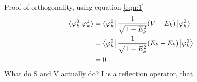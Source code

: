 \documentclass{article}
\begin{document}
Proof of orthogonality, using equation \ref{eqn:1}
\begin{align*}
\braket{\varphi_k^0}{\varphi_k^1} &= \bra{\varphi_k^0}  \frac{1}{\sqrt{1 - E^2_k}}(V-E_k) \ket{\varphi_k^0}\\
&= \bra{\varphi_k^0}  \frac{1}{\sqrt{1 - E^2_k}}(E_k-E_k) \ket{\varphi_k^0}\\
&= 0
\end{align*}
What do S and V actually do?
I is a reflection operator, that


\printbibliography
\end{document}
